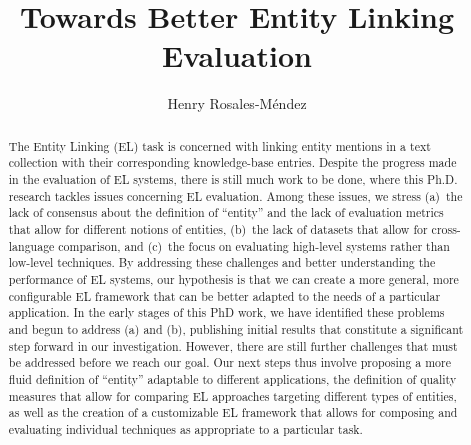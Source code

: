 \documentclass[sigconf]{acmart}
\begin{document}
%
\title{Towards Better Entity Linking Evaluation}

%
\author{Henry Rosales-M\'endez}




%
\renewcommand{\shortauthors}{Rosales-M\'endez et al.}

%
\begin{abstract}
The Entity Linking (EL) task is concerned with linking entity mentions in a text collection with their corresponding knowledge-base entries. Despite the progress made in the evaluation of EL systems, there is still much work to be done, where this Ph.D. research tackles issues concerning EL evaluation. Among these issues, we stress (a)~the lack of consensus about the definition of ``entity'' and the lack of evaluation metrics that allow for different notions of entities, (b)~the lack of datasets that allow for cross-language comparison, and (c)~the focus on evaluating high-level systems rather than low-level techniques. By addressing these challenges and better understanding the performance of EL systems, our hypothesis is that we can create a more general, more configurable EL framework that can be better adapted to the needs of a particular application. In the early stages of this PhD work, we have identified these problems and begun to address (a) and (b), publishing initial results that constitute a significant step forward in our investigation. However, there are still further challenges that must be addressed before we reach our goal. Our next steps thus involve proposing a more fluid definition of ``entity'' adaptable to different applications, the definition of quality measures that allow for comparing EL approaches targeting different types of entities, as well as the creation of a customizable EL framework that allows for composing and evaluating individual techniques as appropriate to a particular task.
\end{abstract}
\end{document}
